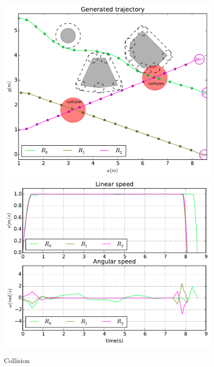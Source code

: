 \documentclass[eprint]{actapoly}
\begin{document}

\begin{figure}[!h]\centering
  \includegraphics[width=\linewidth]{./images/collision/multirobot-path2.pdf} %
  \\[1mm]
  \includegraphics[width=\linewidth]{./images/collision/multirobot-vw2.pdf} %
  \caption{Collision\label{fig:collision}}
\label{fig:res}
\end{figure}
\end{document}

